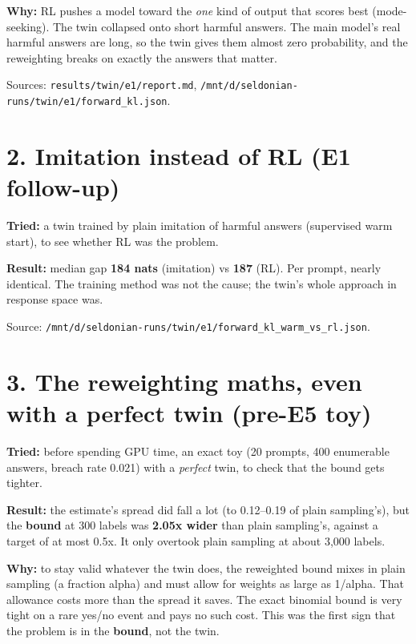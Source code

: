 \documentclass[11pt]{article}
\begin{document}
\textbf{Why:} RL pushes a model toward the \emph{one} kind of output that scores best (mode-seeking). The twin collapsed onto short harmful answers. The main model's real harmful answers are long, so the twin gives them almost zero probability, and the reweighting breaks on exactly the answers that matter.


Sources: \texttt{results/\allowbreak twin/\allowbreak e1/\allowbreak report.md}, \texttt{/\allowbreak mnt/\allowbreak d/\allowbreak seldonian-runs/\allowbreak twin/\allowbreak e1/\allowbreak forward\_\allowbreak kl.json}.


\section*{2. Imitation instead of RL (E1 follow-up)}

\textbf{Tried:} a twin trained by plain imitation of harmful answers (supervised warm start), to see whether RL was the problem.


\textbf{Result:} median gap \textbf{184 nats} (imitation) vs \textbf{187} (RL). Per prompt, nearly identical. The training method was not the cause; the twin's whole approach in response space was.


Source: \texttt{/\allowbreak mnt/\allowbreak d/\allowbreak seldonian-runs/\allowbreak twin/\allowbreak e1/\allowbreak forward\_\allowbreak kl\_\allowbreak warm\_\allowbreak vs\_\allowbreak rl.json}.


\section*{3. The reweighting maths, even with a perfect twin (pre-E5 toy)}

\textbf{Tried:} before spending GPU time, an exact toy (20 prompts, 400 enumerable answers, breach rate 0.021) with a \emph{perfect} twin, to check that the bound gets tighter.


\textbf{Result:} the estimate's spread did fall a lot (to 0.12--0.19 of plain sampling's), but the \textbf{bound} at 300 labels was \textbf{2.05x wider} than plain sampling's, against a target of at most 0.5x. It only overtook plain sampling at about 3,000 labels.


\textbf{Why:} to stay valid whatever the twin does, the reweighted bound mixes in plain sampling (a fraction alpha) and must allow for weights as large as 1/alpha. That allowance costs more than the spread it saves. The exact binomial bound is very tight on a rare yes/no event and pays no such cost. This was the first sign that the problem is in the \textbf{bound}, not the twin.
\end{document}
